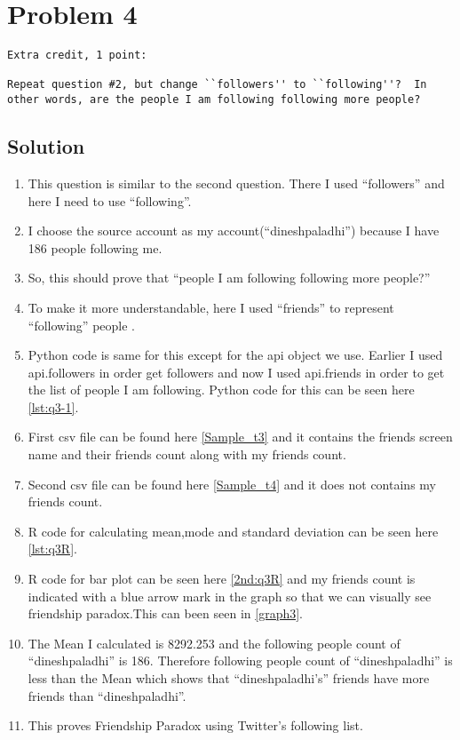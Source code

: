 

\section{Problem 4}
\label{part4}
\begin{verbatim}
Extra credit, 1 point:

Repeat question #2, but change ``followers'' to ``following''?  In
other words, are the people I am following following more people?

\end{verbatim}

\subsection{Solution}
\begin{enumerate}
\item This question is similar to the second question. There I used ``followers'' and here I need to use ``following''.
\item I choose the source account as my account(``dineshpaladhi'') because I have 186 people following me.
\item So, this should prove that ``people I am following following more people?''
\item To make it more understandable, here I used ``friends'' to represent ``following'' people .
\item Python code is same for this except for the api object we use. Earlier I used api.followers in order get followers and now I used api.friends in order to get the list of people I am following. Python code for this can be seen here \ref{lst:q3-1}.
\item First csv file can be found here \ref{Sample_t3} and it contains the friends screen name and their friends count along with my friends count.
\item Second csv file can be found here \ref{Sample_t4} and it does not contains my friends count.
\item R code for calculating mean,mode and standard deviation can be seen here \ref{lst:q3R}.
\item R code for bar plot can be seen here \ref{2nd:q3R} and my friends count is indicated with a blue arrow mark in the graph so that we can visually see friendship paradox.This can been seen in \ref{graph3}.
\item The Mean I calculated is 8292.253 and the following people count of ``dineshpaladhi'' is 186. Therefore following people count of ``dineshpaladhi'' is less than the Mean which shows that ``dineshpaladhi's'' friends have more friends than ``dineshpaladhi''. 
\item This proves Friendship Paradox using Twitter's following list.
\end{enumerate}
\newpage

